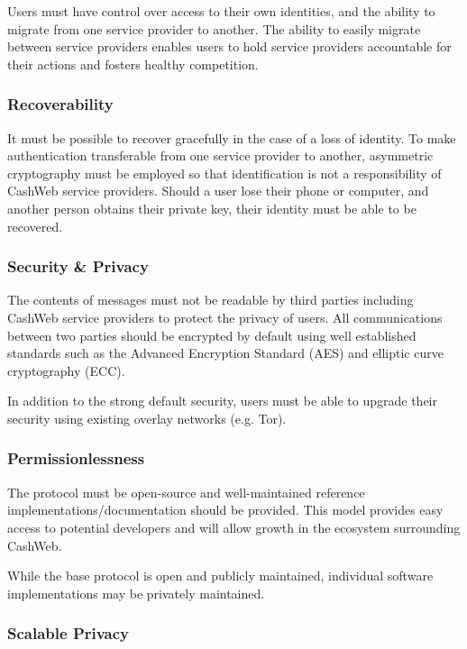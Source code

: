 \documentclass{article}
\begin{document}
Users must have control over access to their own identities, and the ability to migrate from one service provider to another. The ability to easily migrate between service providers enables users to hold service providers accountable for their actions and fosters healthy competition.

\subsubsection{Recoverability}

It must be possible to recover gracefully in the case of a loss of identity. To make authentication transferable from one service provider to another, asymmetric cryptography must be employed so that identification is not a responsibility of CashWeb service providers. Should a user lose their phone or computer, and another person obtains their private key, their identity must be able to be recovered.

\subsubsection{Security \& Privacy}

The contents of messages must not be readable by third parties including CashWeb service providers to protect the privacy of users. All communications between two parties should be encrypted by default using well established standards such as the Advanced Encryption Standard (AES) and elliptic curve cryptography (ECC).

In addition to the strong default security, users must be able to upgrade their security using existing overlay networks (e.g. Tor).

\subsubsection{Permissionlessness}

The protocol must be open-source and well-maintained reference implementations/documentation should be provided. This model provides easy access to potential developers and will allow growth in the ecosystem surrounding CashWeb.

While the base protocol is open and publicly maintained, individual software implementations may be privately maintained.

\subsubsection{Scalable Privacy}
\end{document}
